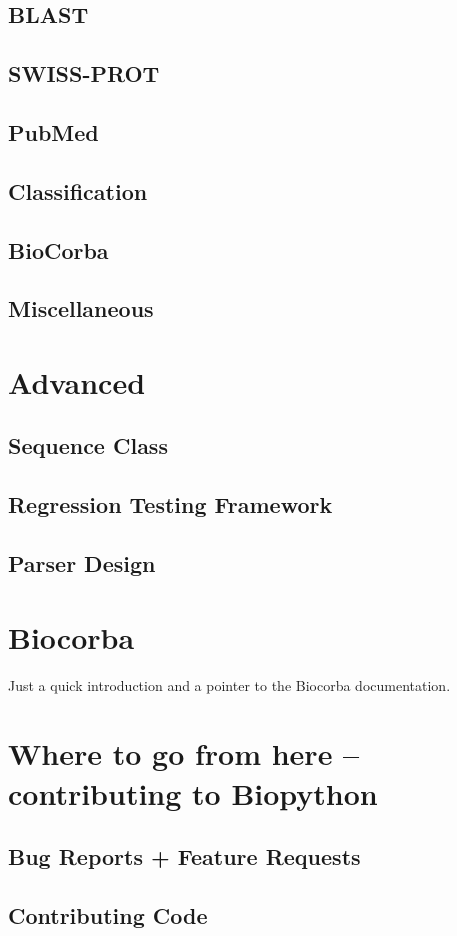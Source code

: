 \documentclass[dvips]{article}
\begin{document}
\subsection{BLAST}

\subsection{SWISS-PROT}

\subsection{PubMed}

\subsection{Classification}

\subsection{BioCorba}

\subsection{Miscellaneous}



\section{Advanced}

\subsection{Sequence Class}

\subsection{Regression Testing Framework}

\subsection{Parser Design}



\section{Biocorba}

Just a quick introduction and a pointer to the
Biocorba documentation.


\section{Where to go from here -- contributing to
Biopython}

\subsection{Bug Reports + Feature
Requests}

\subsection{Contributing Code}
\end{document}
